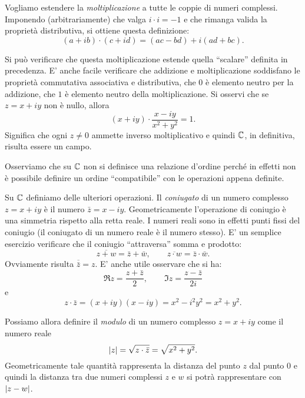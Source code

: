 Vogliamo estendere la \emph{moltiplicazione}%
%
 a tutte le coppie di numeri complessi.
Imponendo (arbitrariamente) che valga $i\cdot i = -1$ e che rimanga
valida la proprietà distributiva, si ottiene
questa definizione:
\[
   (a+ib) \cdot (c+id) = (ac-bd) + i(ad+bc).
\]

Si può verificare che questa moltiplicazione estende quella ``scalare'' definita
in precedenza.
E' anche facile verificare che addizione e moltiplicazione soddisfano
le proprietà commutativa associativa e distributiva,
che $0$ è elemento neutro per la addizione, che $1$ è elemento neutro
della moltiplicazione.
Si osservi che se $z=x+iy$ non è nullo, allora
\[
  (x+iy) \cdot \frac{x-iy}{x^2+y^2} = 1.
\]
Significa che ogni $z\neq 0$ ammette inverso moltiplicativo e quindi ${\mathbb C}$,
in definitiva,
risulta essere un campo.

Osserviamo che su ${\mathbb C}$ non si definisce una relazione d'ordine perché
in effetti non è possibile definire un ordine ``compatibile'' con le operazioni
appena definite.%

Su ${\mathbb C}$ definiamo delle ulteriori operazioni.
Il \emph{coniugato}%
%
%
di un numero complesso $z=x+iy$ è il numero
$\bar z = x - iy$. Geometricamente l'operazione di coniugio è una simmetria
rispetto alla retta reale. I numeri reali sono in effetti punti fissi del
coniugio (il coniugato di un numero reale è il numero stesso).
E' un semplice esercizio verificare che il coniugio ``attraversa''
somma e prodotto:
\[
\overline{z+w} = \bar z + \bar w, \qquad
\overline{z\cdot w} = \bar z \cdot \bar w.
\]
Ovviamente risulta $\overline {\bar z} = z$.
E' anche utile osservare che si ha:
\begin{equation}\label{eq:re_im}
  \Re z = \frac{z+\bar z}{2}, \qquad
  \Im z = \frac{z-\bar z}{2i}
\end{equation}
e
\[
z \cdot \bar z = (x+iy)(x-iy) = x^2-i^2y^2 = x^2+y^2.
\]

Possiamo allora definire il
\emph{modulo}%
%
%
 di un numero complesso $z=x+iy$
come il numero reale
\[
{\left|z\right|} = \sqrt{z\cdot\bar z} = \sqrt{x^2+y^2}.
\]
Geometricamente tale quantità rappresenta la distanza del punto $z$
dal punto $0$ e quindi la distanza tra due numeri complessi $z$ e
$w$ si potrà rappresentare con ${\left|z-w\right|}$.

